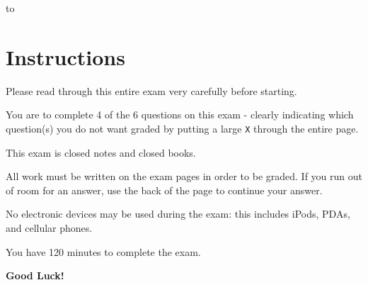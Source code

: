 \documentclass[11pt]{exam}
\begin{document}
\begin{center} 
\end{center} 

\lstset{language=Python,numbers=left}

\vspace{0.1in} 
\hbox to \textwidth{Name:\enspace\hrulefill} 

\section*{Instructions}

Please read through this entire exam very carefully before starting.
\par
You are to complete 4 of the 6 questions on this exam - clearly indicating which question(s) you do not want graded by putting a large {\tt X} through the entire page.
\par
This exam is closed notes and closed books.
\par
All work must be written on the exam pages in order to be graded.   If you run out of room for an answer, use the back of the page to continue your answer. 
\par
No electronic devices may be used during the exam: this includes iPods, PDAs, and cellular phones.
\par
You have 120 minutes to complete the exam.  
\par
{\bf Good Luck!}


\newpage
\end{document}
